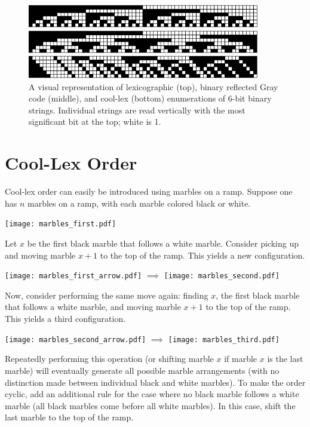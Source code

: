 \begin{figure}
    \centering
\includegraphics[width=4in]{BLX6-cropped.pdf} 

\includegraphics[width=4in]{BRGC6-cropped.pdf} 

\includegraphics[width=4in]{BCLX6-cropped.pdf} 

    \caption[A visual representation of lexicographic (top), binary reflected Gray code (middle), and cool-lex (bottom) enumerations of 6-bit binary strings.]{A visual representation of lexicographic (top), binary reflected Gray code (middle), and cool-lex (bottom) enumerations of 6-bit binary strings. Individual strings are read vertically with the most significant bit at the top; white is 1.
    }
    \label{binary}
\end{figure}

\section{Cool-Lex Order} \label{sec:coolIntro}

Cool-lex order can easily be introduced using marbles on a ramp. Suppose one has $n$ marbles on a ramp, with each marble colored black or white.  

\texttt{[image: marbles\_first.pdf]} 


Let $x$ be the first black marble that follows a white marble. Consider picking up and moving marble $x+1$ to the top of the ramp. This yields a new configuration.

\texttt{[image: marbles\_first\_arrow.pdf]} $\implies$
\texttt{[image: marbles\_second.pdf]} 

Now, consider performing the same move again: finding $x$, the first black marble that follows a white marble, and moving marble $x+1$ to the top of the ramp. This yields a third configuration.

\texttt{[image: marbles\_second\_arrow.pdf]} $\implies$
\texttt{[image: marbles\_third.pdf]} 

Repeatedly performing this operation (or shifting marble $x$ if marble $x$ is the last marble) will eventually generate all possible marble arrangements (with no distinction made between individual black and white marbles). To make the order cyclic, add an additional rule for the case where no black marble follows a white marble (all black marbles come before all white marbles).  In this case, shift the last marble to the top of the ramp. 

